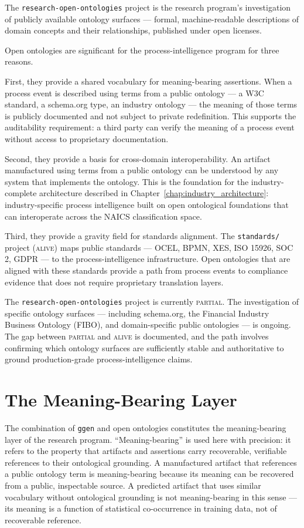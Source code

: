 The \texttt{research-open-ontologies} project is the research program's investigation of publicly available ontology surfaces --- formal, machine-readable descriptions of domain concepts and their relationships, published under open licenses.

Open ontologies are significant for the process-intelligence program for three reasons.

First, they provide a shared vocabulary for meaning-bearing assertions. When a process event is described using terms from a public ontology --- a W3C standard, a schema.org type, an industry ontology --- the meaning of those terms is publicly documented and not subject to private redefinition. This supports the auditability requirement: a third party can verify the meaning of a process event without access to proprietary documentation.

Second, they provide a basis for cross-domain interoperability. An artifact manufactured using terms from a public ontology can be understood by any system that implements the ontology. This is the foundation for the industry-complete architecture described in Chapter~\ref{chap:industry_architecture}: industry-specific process intelligence built on open ontological foundations that can interoperate across the NAICS classification space.

Third, they provide a gravity field for standards alignment. The \texttt{standards/} project (\textsc{alive}) maps public standards --- OCEL, BPMN, XES, ISO 15926, SOC 2, GDPR --- to the process-intelligence infrastructure. Open ontologies that are aligned with these standards provide a path from process events to compliance evidence that does not require proprietary translation layers.

The \texttt{research-open-ontologies} project is currently \textsc{partial}. The investigation of specific ontology surfaces --- including schema.org, the Financial Industry Business Ontology (FIBO), and domain-specific public ontologies --- is ongoing. The gap between \textsc{partial} and \textsc{alive} is documented, and the path involves confirming which ontology surfaces are sufficiently stable and authoritative to ground production-grade process-intelligence claims.

\section{The Meaning-Bearing Layer}

The combination of \texttt{ggen} and open ontologies constitutes the meaning-bearing layer of the research program. ``Meaning-bearing'' is used here with precision: it refers to the property that artifacts and assertions carry recoverable, verifiable references to their ontological grounding. A manufactured artifact that references a public ontology term is meaning-bearing because its meaning can be recovered from a public, inspectable source. A predicted artifact that uses similar vocabulary without ontological grounding is not meaning-bearing in this sense --- its meaning is a function of statistical co-occurrence in training data, not of recoverable reference.


